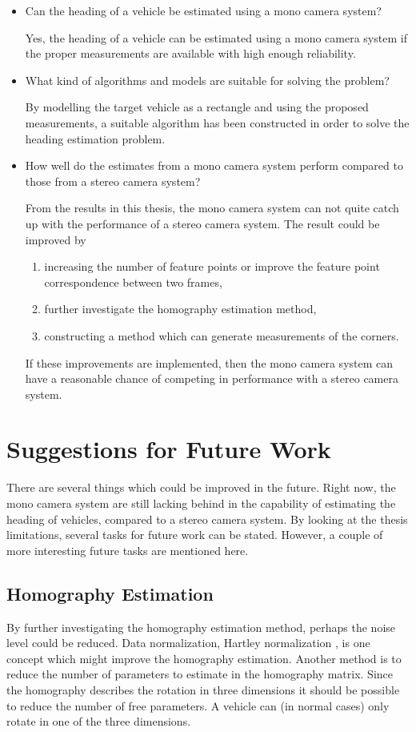 \begin{itemize}
    \item Can the heading of a vehicle be estimated using a mono camera system?

    Yes, the heading of a vehicle can be estimated using a mono camera system if the proper measurements are available with high enough reliability.

    \item What kind of algorithms and models are suitable for solving the problem?

    By modelling the target vehicle as a rectangle and using the proposed measurements, a suitable algorithm has been constructed in order to solve the heading estimation problem.

    \item How well do the estimates from a mono camera system perform compared to those from a stereo camera system?

    From the results in this thesis, the mono camera system can not quite catch up with the performance of a stereo camera system.
    The result could be improved by
	\begin{enumerate}[label=\roman*)]
		\item increasing the number of feature points or improve the feature point correspondence between two frames,
		\item further investigate the homography estimation method,
		\item constructing a method which can generate measurements of the corners.
	\end{enumerate}
	If these improvements are implemented, then the mono camera system can have a reasonable chance of competing in performance with a stereo camera system.
\end{itemize}

\section{Suggestions for Future Work}
There are several things which could be improved in the future.
Right now, the mono camera system are still lacking behind in the capability of estimating the heading of vehicles, compared to a stereo camera system.
By looking at the thesis limitations, several tasks for future work can be stated.
However, a couple of more interesting future tasks are mentioned here.

\subsection{Homography Estimation}
By further investigating the homography estimation method, perhaps the noise level could be reduced.
Data normalization, \eg Hartley normalization \cite{Nordberg:2015}, is one concept which might improve the homography estimation.
Another method is to reduce the number of parameters to estimate in the homography matrix.
Since the homography describes the rotation in three dimensions it should be possible to reduce the number of free parameters.
A vehicle can (in normal cases) only rotate in one of the three dimensions.

